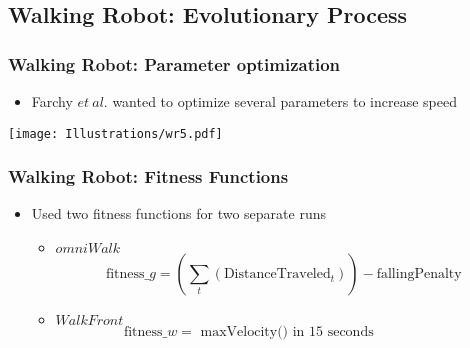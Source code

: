 \documentclass{beamer}
\begin{document}


\subsection{Walking Robot: Evolutionary Process}
\begin{frame}
  \frametitle{Walking Robot: Parameter optimization}
\begin{itemize}
\item Farchy $et~al.$ wanted to optimize several parameters to increase speed
\end{itemize}
\begin{center}
 \texttt{[image: Illustrations/wr5.pdf]}
       \\
\end{center}
\end{frame}

\begin{frame}[fragile]
  \frametitle{Walking Robot: Fitness Functions}
\begin{itemize}
\item Used two fitness functions for two separate runs
\begin{itemize}
\item $omniWalk$
\[
  \textrm{fitness}\_g = (\sum_{t} (\textrm{DistanceTraveled}_t)) - \textrm{fallingPenalty}
\]
\item $WalkFront$
\[
  \textrm{fitness}\_w = \textrm{ maxVelocity() in 15 seconds} \qquad\qquad\quad
\]
\end{itemize}
\end{itemize}

\end{frame}
\end{document}
